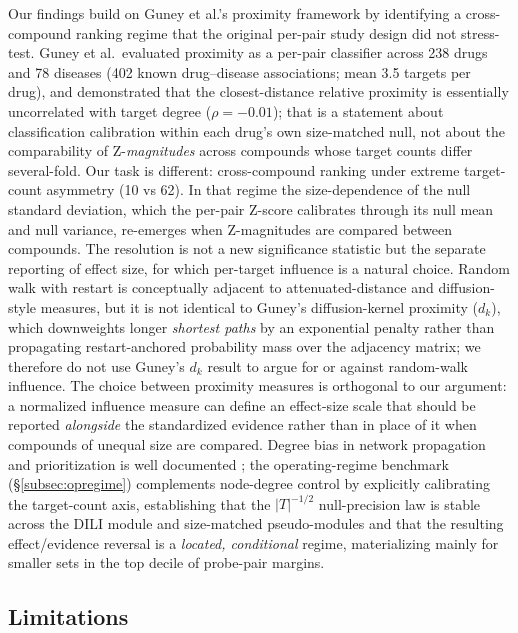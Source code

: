 Our findings build on Guney et al.'s proximity framework \citep{Guney2016} by identifying a cross-compound ranking regime that the original per-pair study design did not stress-test. Guney et al.\ evaluated proximity as a per-pair classifier across 238 drugs and 78 diseases (402 known drug--disease associations; mean 3.5 targets per drug), and demonstrated that the closest-distance relative proximity is essentially uncorrelated with target degree ($\rho=-0.01$); that is a statement about classification calibration within each drug's own size-matched null, not about the comparability of Z-\textit{magnitudes} across compounds whose target counts differ several-fold. Our task is different: cross-compound ranking under extreme target-count asymmetry (10 vs 62). In that regime the size-dependence of the null standard deviation, which the per-pair Z-score calibrates through its null mean and null variance, re-emerges when Z-magnitudes are compared between compounds. The resolution is not a new significance statistic but the separate reporting of effect size, for which per-target influence is a natural choice. Random walk with restart is conceptually adjacent to attenuated-distance and diffusion-style measures, but it is not identical to Guney's diffusion-kernel proximity ($d_k$), which downweights longer \emph{shortest paths} by an exponential penalty rather than propagating restart-anchored probability mass over the adjacency matrix; we therefore do not use Guney's $d_k$ result to argue for or against random-walk influence. The choice between proximity measures is orthogonal to our argument: a normalized influence measure can define an effect-size scale that should be reported \emph{alongside} the standardized evidence rather than in place of it when compounds of unequal size are compared. Degree bias in network propagation and prioritization is well documented \citep{Erten2011, Cowen2017, Barel2020}; the operating-regime benchmark (\S\ref{subsec:opregime}) complements node-degree control by explicitly calibrating the target-count axis, establishing that the $|T|^{-1/2}$ null-precision law is stable across the DILI module and size-matched pseudo-modules and that the resulting effect/evidence reversal is a \emph{located, conditional} regime, materializing mainly for smaller sets in the top decile of probe-pair margins.

\subsection{Limitations}


